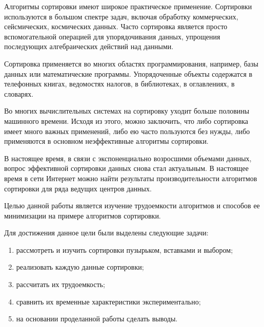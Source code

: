 \Introduction

\setcounter{page}{2}

Алгоритмы сортировки имеют широкое практическое применение. Сортировки используются в большом спектре задач, включая обработку коммерческих, сейсмических, космических данных. Часто сортировка является просто вспомогательной операцией для упорядочивания данных, упрощения последующих алгебраических действий над данными.

Сортировка применяется во многих областях программирования, например, базы данных или математические программы. Упорядоченные объекты содержатся в телефонных книгах, ведомостях налогов, в библиотеках,
в оглавлениях, в словарях.

Во многих вычислительных системах на сортировку уходит больше половины машинного времени. Исходя из этого, можно заключить, что либо сортировка имеет много важных применений, либо ею часто пользуются
без нужды, либо применяются в основном неэффективные алгоритмы сортировки.

В настоящее время, в связи с экспоненциально возросшими объемами данных, вопрос эффективной сортировки данных снова стал актуальным. В настоящее время в сети Интернет можно найти результаты производительности алгоритмов сортировки для ряда ведущих центров данных. 

Целью данной работы является изучение трудоемкости алгоритмов и способов ее минимизации на примере алгоритмов сортировки.

Для достижения данное цели были выделены следующие задачи:
\begin{enumerate}
\item рассмотреть и изучить сортировки пузырьком, вставками и выбором;
\item реализовать каждую данные сортировки;
\item рассчитать их трудоемкость;
\item сравнить их временные характеристики экспериментально;
\item на основании проделанной работы сделать выводы.
\end{enumerate}


